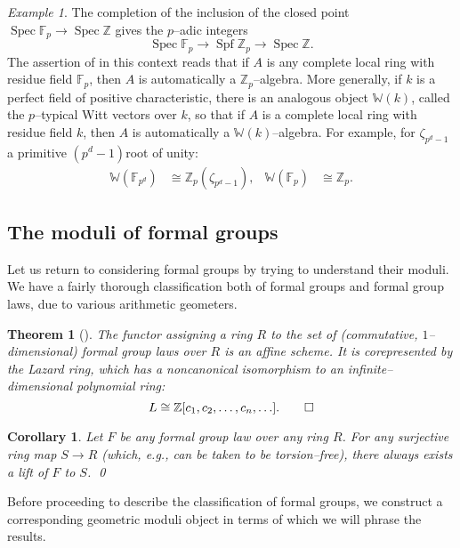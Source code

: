 \documentclass{amsart}
\newcommand{\Z}{\mathbb Z}
\newcommand{\F}{\mathbb F}
\newcommand{\W}{\mathbb W}
\newcommand{\<}{\langle}
\renewcommand{\>}{\rangle}
\DeclareMathOperator{\Spec}{Spec}
\DeclareMathOperator{\Spf}{Spf}
\theoremstyle{plain}
\newtheorem*{theorem}{Theorem}
\newtheorem*{corollary}{Corollary}
\theoremstyle{definition}
\theoremstyle{remark}
\newtheorem*{example}{Example}
\begin{document}
\begin{example}
The completion of the inclusion of the closed point $\Spec \F_p \to \Spec \Z$ gives the $p$--adic integers \[\Spec \F_p \to \Spf \Z_p \to \Spec \Z.\] The assertion of  in this context reads that if $A$ is any complete local ring with residue field $\F_p$, then $A$ is automatically a $\Z_p$--algebra.  More generally, if $k$ is a perfect field of positive characteristic, there is an analogous object $\W(k)$, called the $p$--typical Witt vectors over $k$, so that if $A$ is a complete local ring with residue field $k$, then $A$ is automatically a $\W(k)$--algebra.  For example, for $\zeta_{p^d-1}$ a primitive $(p^d-1)$\th root of unity:
\begin{align*}
\W(\F_{p^d}) & \cong \Z_p(\zeta_{p^d-1}), & \W(\F_p) & \cong \Z_p.
\end{align*}
\end{example}

\subsection{The moduli of formal groups}

Let us return to considering formal groups by trying to understand their moduli.  We have a fairly thorough classification both of formal groups and formal group laws, due to various arithmetic geometers.

\begin{theorem}[{\cite{Lazard}}]\label{DefnLazardRing}
The functor assigning a ring $R$ to the set of (commutative, $1$--dimensional) formal group laws over $R$ is an affine scheme.  It is corepresented by the Lazard ring, which has a noncanonical isomorphism to an infinite--dimensional polynomial ring: \[L \cong \Z[c_1, c_2, \ldots, c_n, \ldots]. \qed\]
\end{theorem}

\begin{corollary}\label{TorsionFreeLifts}
Let $F$ be any formal group law over any ring $R$.  For any surjective ring map $S \to R$ (which, e.g., can be taken to be torsion--free), there always exists a lift of $F$ to $S$. \qed
\end{corollary}

Before proceeding to describe the classification of formal groups, we construct a corresponding geometric moduli object in terms of which we will phrase the results.
\end{document}
